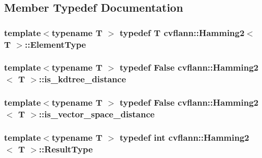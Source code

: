 \subsection{Member Typedef Documentation}
\hypertarget{structcvflann_1_1Hamming2_a334d2a82d1094c80367ae6e8defd3561}{
\subsubsection[{Element\-Type}]{\setlength{\rightskip}{0pt plus 5cm}template$<$typename T $>$ typedef {\bf T} {\bf cvflann\-::\-Hamming2}$<$ {\bf T} $>$\-::{\bf Element\-Type}}}\label{structcvflann_1_1Hamming2_a334d2a82d1094c80367ae6e8defd3561}
\hypertarget{structcvflann_1_1Hamming2_a8e207493c0cb89f608de61095186e58a}{
\subsubsection[{is\-\_\-kdtree\-\_\-distance}]{\setlength{\rightskip}{0pt plus 5cm}template$<$typename T $>$ typedef {\bf False} {\bf cvflann\-::\-Hamming2}$<$ {\bf T} $>$\-::{\bf is\-\_\-kdtree\-\_\-distance}}}\label{structcvflann_1_1Hamming2_a8e207493c0cb89f608de61095186e58a}
\hypertarget{structcvflann_1_1Hamming2_a7572b1466e814fee469fef9b279ce9e5}{
\subsubsection[{is\-\_\-vector\-\_\-space\-\_\-distance}]{\setlength{\rightskip}{0pt plus 5cm}template$<$typename T $>$ typedef {\bf False} {\bf cvflann\-::\-Hamming2}$<$ {\bf T} $>$\-::{\bf is\-\_\-vector\-\_\-space\-\_\-distance}}}\label{structcvflann_1_1Hamming2_a7572b1466e814fee469fef9b279ce9e5}
\hypertarget{structcvflann_1_1Hamming2_a06581206d8fcf7b0282ea2813cb9f732}{
\subsubsection[{Result\-Type}]{\setlength{\rightskip}{0pt plus 5cm}template$<$typename T $>$ typedef int {\bf cvflann\-::\-Hamming2}$<$ {\bf T} $>$\-::{\bf Result\-Type}}}\label{structcvflann_1_1Hamming2_a06581206d8fcf7b0282ea2813cb9f732}


